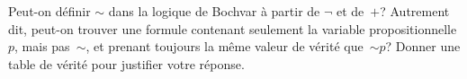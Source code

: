 \documentclass[../../../include/open-logic-section]{subfiles}
\begin{document}
\begin{prob}
  Peut-on définir $\sim$ dans la
  logique de Bochvar à partir de
  $\lnot$ et de~$+$? Autrement dit,
  peut-on trouver une formule contenant
  seulement la variable propositionnelle
  $p$, mais pas~$\sim$, et prenant
  toujours la même valeur de vérité
  que~$\mathord{\sim}p$? Donner une
  table de vérité pour justifier
  votre réponse.
\end{prob}
\end{document}
